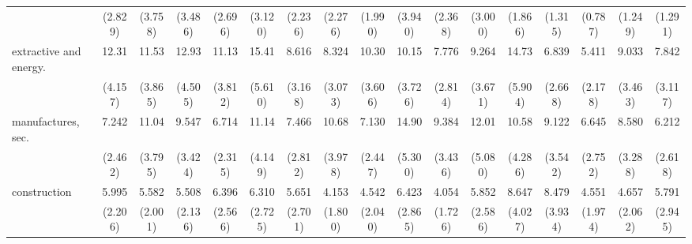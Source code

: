 {\begin{tabular}{l*{16}{c}}
                    &     (2.829)         &     (3.758)         &     (3.486)         &     (2.696)         &     (3.120)         &     (2.236)         &     (2.276)         &     (1.990)         &     (3.940)         &     (2.368)         &     (3.000)         &     (1.866)         &     (1.315)         &     (0.787)         &     (1.249)         &     (1.291)         \\
[1em]
extractive and energy.&       12.31\sym{***}&       11.53\sym{***}&       12.93\sym{***}&       11.13\sym{***}&       15.41\sym{***}&       8.616\sym{***}&       8.324\sym{***}&       10.30\sym{***}&       10.15\sym{***}&       7.776\sym{***}&       9.264\sym{***}&       14.73\sym{***}&       6.839\sym{***}&       5.411\sym{***}&       9.033\sym{***}&       7.842\sym{***}\\
                    &     (4.157)         &     (3.865)         &     (4.505)         &     (3.812)         &     (5.610)         &     (3.168)         &     (3.073)         &     (3.606)         &     (3.726)         &     (2.814)         &     (3.671)         &     (5.904)         &     (2.668)         &     (2.178)         &     (3.463)         &     (3.117)         \\
[1em]
manufactures, sec.  &       7.242\sym{***}&       11.04\sym{***}&       9.547\sym{***}&       6.714\sym{***}&       11.14\sym{***}&       7.466\sym{***}&       10.68\sym{***}&       7.130\sym{***}&       14.90\sym{***}&       9.384\sym{***}&       12.01\sym{***}&       10.58\sym{***}&       9.122\sym{***}&       6.645\sym{***}&       8.580\sym{***}&       6.212\sym{***}\\
                    &     (2.462)         &     (3.795)         &     (3.424)         &     (2.315)         &     (4.149)         &     (2.812)         &     (3.978)         &     (2.447)         &     (5.300)         &     (3.436)         &     (5.080)         &     (4.286)         &     (3.542)         &     (2.752)         &     (3.288)         &     (2.618)         \\
[1em]
construction        &       5.995\sym{***}&       5.582\sym{***}&       5.508\sym{***}&       6.396\sym{***}&       6.310\sym{***}&       5.651\sym{***}&       4.153\sym{**} &       4.542\sym{***}&       6.423\sym{***}&       4.054\sym{**} &       5.852\sym{***}&       8.647\sym{***}&       8.479\sym{***}&       4.551\sym{***}&       4.657\sym{***}&       5.791\sym{***}\\
                    &     (2.206)         &     (2.001)         &     (2.136)         &     (2.566)         &     (2.725)         &     (2.701)         &     (1.800)         &     (2.040)         &     (2.865)         &     (1.726)         &     (2.586)         &     (4.027)         &     (3.934)         &     (1.974)         &     (2.062)         &     (2.945)         \\

\end{tabular}}
